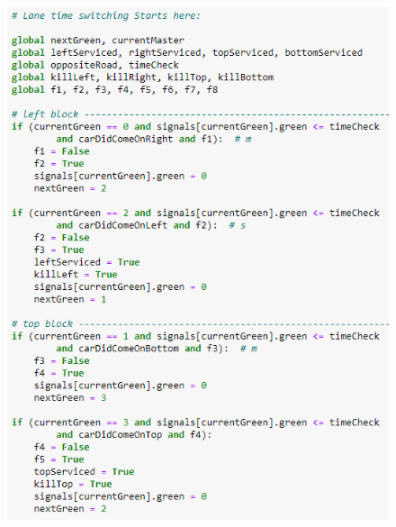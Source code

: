 \documentclass[12pt, a4paper,titlepage]{article}
\begin{document}
\begin{figure}[H]
	\centering
	\includegraphics[width=\linewidth]{images/p5}
	\caption{}
	\label{fig:p5}
\end{figure}
\end{document}
